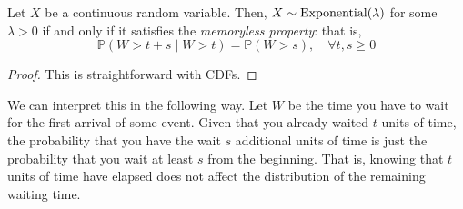 	\begin{lemma}
		\label{thm:memoryless-property}
		Let $X$ be a continuous random variable. Then, $X \sim \operatorname{Exponential}(\lambda)$ for some $\lambda > 0$ if and only if it satisfies the \textit{memoryless property}: that is, 
		\begin{equation}
			\mathbb{P}(W > t + s \mid W > t) = \mathbb{P}(W > s), \quad \forall t, s \geq 0
		\end{equation}
	\end{lemma}
	\begin{proof}
	  This is straightforward with CDFs. 
	\end{proof}

	We can interpret this in the following way. Let $W$ be the time you have to wait for the first arrival of some event. Given that you already waited $t$ units of time, the probability that you have the wait $s$ additional units of time is just the probability that you wait at least $s$ from the beginning. That is, knowing that $t$ units of time have elapsed does not affect the distribution of the remaining waiting time. 


